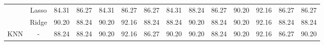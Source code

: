 \begin{landscape}
\begin{table}[]
{\begin{tabular}{cc|cccccccccccc}
                                & Lasso                                 & 84.31                                                             & 86.27                                                                & 84.31                                                                & 86.27                                                               & 86.27                                                            & \multicolumn{1}{c|}{84.31}                                                                   & 88.24                                                             & 86.27                                                                & 90.20                                                                & 92.16                                                               & 86.27                                                            & 86.27                                                                   \\ 
                                 & Ridge                                 & 90.20                                                             & 88.24                                                                & 90.20                                                                & 92.16                                                               & 88.24                                                            & \multicolumn{1}{c|}{88.24}                                                                   & 90.20                                                             & 88.24                                                                & 90.20                                                                & 92.16                                                               & 88.24                                                            & 88.24                                                                   \\ \hline
KNN                             & -                                     & 88.24                                                             & 88.24                                                                & 90.20                                                                & 92.16                                                               & 86.27                                                            & \multicolumn{1}{c|}{90.20}                                                                   & 90.20                                                             & 88.24                                                                & 90.20                                                                & 92.16                                                               & 86.27                                                            & 90.20                                                                   \\ \hline

\end{tabular}}
\end{table}
\end{landscape}
